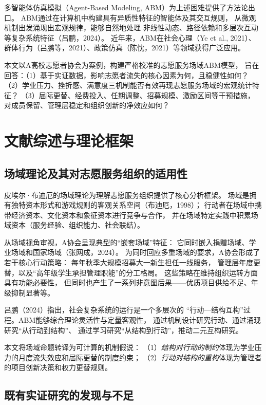 \documentclass[12pt,a4paper]{article}
\begin{document}
多智能体仿真模拟（Agent-Based Modeling, ABM）为上述困难提供了方法论出口。
ABM通过在计算机中构建具有异质性特征的智能体及其交互规则，
从微观机制出发涌现出宏观规律，能够自然地处理
非线性动态、路径依赖和多层次互动等复杂系统特征（吕鹏，2024）。
近年来，ABM在社会心理（Ye et al., 2021）、
群体行为（吕鹏等，2021）、政策仿真（陈忱，2021）等领域获得广泛应用。

本文以A高校志愿者协会为案例，构建严格校准的志愿服务场域ABM模型，
旨在回答：（1）基于实证数据，影响志愿者流失的核心因素为何，且稳健性如何？
（2）学业压力、挫折感、满意度三机制能否有效再现志愿服务场域的宏观统计特征？
（3）届际更替、经费投入、任期调整、招募规模、激励区间等干预措施，
对成员保留、管理层稳定和组织创新的净效应如何？

\section{文献综述与理论框架}

\subsection{场域理论及其对志愿服务组织的适用性}

皮埃尔·布迪厄的场域理论为理解志愿服务组织提供了核心分析框架。
场域是拥有独特资本形式和游戏规则的客观关系空间（布迪厄，1998）；
行动者在场域中携带经济资本、文化资本和象征资本进行竞争与合作，
并在场域特定实践中积累场域资本（服务经验、组织能力、社会联结）。

从场域视角审视，A协会呈现典型的“嵌套场域”特征：
它同时嵌入捐赠场域、学业场域和国家场域（张网成，2024）。
为同时回应多重场域的要求，A协会形成了若干核心行动策略：
每年秋季大规模招募大一新生担任一线服务，
管理层年度更替，以及“高年级学生承担管理职能”的分工格局。
这些策略在维持组织运转方面具有功能必要性，
但同时也产生了一系列非意图后果——优质项目供给不足、年级抑制显著等。

吕鹏（2024）指出，社会复杂系统的运行是一个多层次的
“行动—结构互构”过程。ABM能够综合理论灵活性与定量客观性，
通过机制设计研究行动、通过涌现研究“从行动到结构”、
通过学习研究“从结构到行动”，推动二元互构研究。

本文将场域命题转译为可计算的机制假说：
（1）\textit{结构对行动的制约}体现为学业压力的月度流失效应和届际更替的制度约束；
（2）\textit{行动对结构的重构}体现为管理者的项目创新决策和权力更替规则。

\subsection{既有实证研究的发现与不足}
\end{document}
